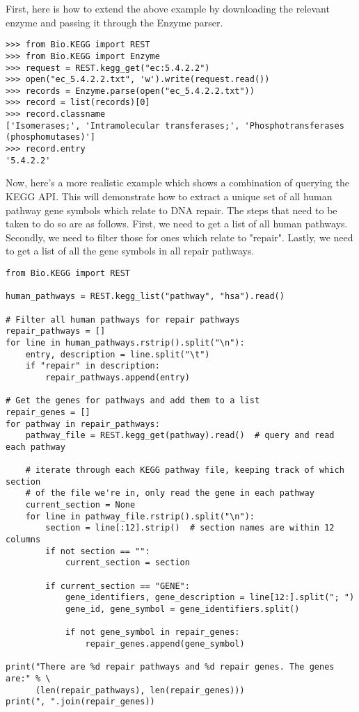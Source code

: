 First, here is how to extend the above example by downloading the relevant enzyme and passing it through the Enzyme parser.

\begin{verbatim}
>>> from Bio.KEGG import REST
>>> from Bio.KEGG import Enzyme
>>> request = REST.kegg_get("ec:5.4.2.2")
>>> open("ec_5.4.2.2.txt", 'w').write(request.read())
>>> records = Enzyme.parse(open("ec_5.4.2.2.txt"))
>>> record = list(records)[0]
>>> record.classname
['Isomerases;', 'Intramolecular transferases;', 'Phosphotransferases (phosphomutases)']
>>> record.entry
'5.4.2.2'
\end{verbatim}

Now, here's a more realistic example which shows a combination of querying the KEGG API. This will demonstrate how to extract a unique set of all human pathway gene symbols which relate to DNA repair. The steps that need to be taken to do so are as follows. First, we need to get a list of all human pathways. Secondly, we need to filter those for ones which relate to "repair". Lastly, we need to get a list of all the gene symbols in all repair pathways.

\begin{verbatim}
from Bio.KEGG import REST

human_pathways = REST.kegg_list("pathway", "hsa").read()

# Filter all human pathways for repair pathways
repair_pathways = []
for line in human_pathways.rstrip().split("\n"):
    entry, description = line.split("\t")
    if "repair" in description:
        repair_pathways.append(entry)

# Get the genes for pathways and add them to a list
repair_genes = [] 
for pathway in repair_pathways:
    pathway_file = REST.kegg_get(pathway).read()  # query and read each pathway

    # iterate through each KEGG pathway file, keeping track of which section
    # of the file we're in, only read the gene in each pathway
    current_section = None
    for line in pathway_file.rstrip().split("\n"):
        section = line[:12].strip()  # section names are within 12 columns
        if not section == "":
            current_section = section
        
        if current_section == "GENE":
            gene_identifiers, gene_description = line[12:].split("; ")
            gene_id, gene_symbol = gene_identifiers.split()

            if not gene_symbol in repair_genes:
                repair_genes.append(gene_symbol)

print("There are %d repair pathways and %d repair genes. The genes are:" % \
      (len(repair_pathways), len(repair_genes)))
print(", ".join(repair_genes))
\end{verbatim}

